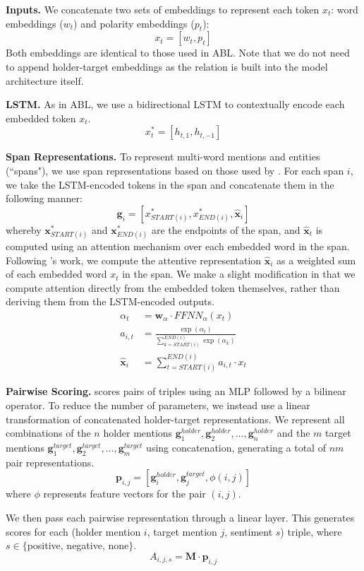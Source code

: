 \documentclass[11pt,a4paper]{article}
\begin{document}
\noindent\textbf{Inputs.}
We concatenate two sets of embeddings to represent each token $x_t$: word embeddings ($w_t$) and polarity embeddings ($p_t$):
	$$x_t = [w_t, p_t]$$
Both embeddings are identical to those used in ABL.
Note that we do not need to append holder-target embeddings as the relation is built into the model architecture itself.

\noindent\textbf{LSTM.}
As in ABL, we use a bidirectional LSTM to contextually encode each embedded token $x_t$.
	$$x^*_t = [h_{t, 1}, h_{t, -1}]$$

\noindent\textbf{Span Representations.}
To represent multi-word mentions and entities (``spans"), we use span representations based on those used by \citet{Lee:17}.
For each span $i$, we take the LSTM-encoded tokens in the span and concatenate them in the following manner:
\begin{equation*}
\textbf{g}_i = [x^*_{START(i)}, x^*_{END(i)}, \hat{\textbf{x}}_i]
\end{equation*}
whereby $\textbf{x}^*_{START(i)}$ and $\textbf{x}^*_{END(i)}$ are the endpoints of the span, and $\hat{\textbf{x}}_t$ is computed using an attention mechanism over each embedded word in the span.
Following \citep{Lee:17}'s work, we compute the attentive representation $\hat{\textbf{x}}_i$ as a weighted sum of each embedded word $x_t$ in the span.
We make a slight modification in that we compute attention directly from the embedded token themselves, rather than deriving them from the LSTM-encoded outputs.
\begin{align*}
	\alpha_t & = \textbf{w}_\alpha \cdot FFNN_\alpha (x_t) \\
	a_{i, t} & = \frac{\exp{(\alpha_t)}}{\sum^{END(i)}_{k=START(i)} \exp{(\alpha_k)}} \\
	\hat{\textbf{x}}_i & = \sum^{END(i)}_{t = START(i)} a_{i, t}\cdot x_t
\end{align*}

\noindent\textbf{Pairwise Scoring.}
 \citet{Verga:18} scores pairs of triples using an MLP followed by a bilinear operator.
To reduce the number of parameters, we instead use a linear transformation of concatenated holder-target representations. 
We represent all combinations of the $n$ holder mentions $\textbf{g}_{1}^{holder}, \textbf{g}_{2}^{holder},\dots,\textbf{g}_{n}^{holder}$ and the $m$ target mentions $\textbf{g}_{1}^{target}, \textbf{g}_{2}^{target},\dots,\textbf{g}_{m}^{target}$ using concatenation, generating a total of $nm$ pair representations.
	$$\textbf{p}_{i, j} = [\textbf{g}_i^{holder}, \textbf{g}_j^{target}, \phi(i, j)]$$
where $\phi$ represents feature vectors for the pair $(i, j)$.
\par We then pass each pairwise representation through a linear layer. This generates scores for each (holder mention $i$, target mention $j$, sentiment $s$) triple, where $s\in\{$positive, negative, none$\}$.
	$$A_{i, j, s} = \textbf{M}\cdot \textbf{p}_{i,j}$$
\end{document}
